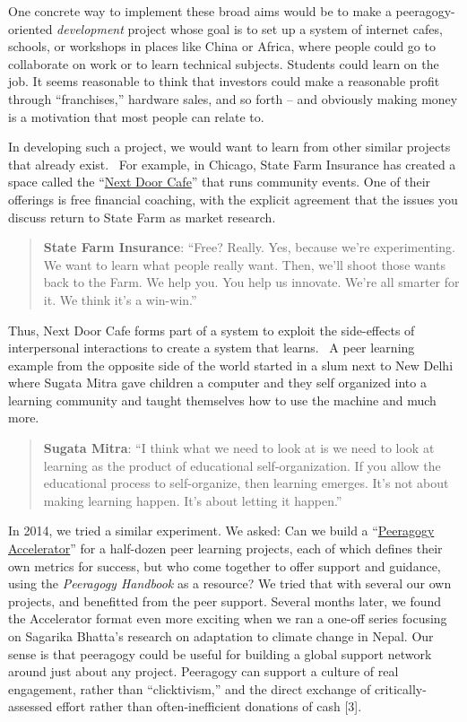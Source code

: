 One concrete way to implement these broad aims would be to make a
peeragogy-oriented \emph{development} project whose goal is to set up a
system of internet cafes, schools, or workshops in places like China or
Africa, where people could go to collaborate on work or to learn
technical subjects. Students could learn on the job. It seems reasonable
to think that investors could make a reasonable profit through
``franchises,'' hardware sales, and so forth -- and obviously making
money is a motivation that most people can relate to.

In developing such a project, we would want to learn from other similar
projects that already exist. ~For example, in Chicago, State Farm
Insurance has created a space called the
``\href{https://www.nextdoorchi.com/}{Next Door Cafe}'' that runs
community events. One of their offerings is free financial coaching,
with the explicit agreement that the issues you discuss return to State
Farm as market research.

\begin{quote}
\textbf{State Farm Insurance}: ``Free? Really. Yes, because we're
experimenting.  We want to learn what people really want. Then, we'll
shoot those wants back to the Farm. We help you. You help us
innovate. We're all smarter for it. We think it's a win-win.''
\end{quote}

Thus, Next Door Cafe forms part of a system to exploit the side-effects
of interpersonal interactions to create a system that learns.~ A peer
learning example from the opposite side of the world started in a slum
next to New Delhi where Sugata Mitra gave children a computer and they
self organized into a learning community and taught themselves how to
use the machine and much more.

\begin{quote}
\textbf{Sugata Mitra}: ``I think what we need to look at is we need to
look at learning as the product of educational self-organization. If
you allow the educational process to self-organize, then learning
emerges.  It's not about making learning happen. It's about letting it
happen.''
\end{quote}

In 2014, we tried a similar experiment.  We asked: Can we build a
``\href{http://commonsabundance.net/docs/help-build-the-peeragogy-accelerator-work-in-progress/}{Peeragogy
  Accelerator}'' for a half-dozen peer learning projects, each of
which defines their own metrics for success, but who come together to
offer support and guidance, using the \emph{Peeragogy Handbook} as a
resource?  We tried that with several our own projects, and benefitted
from the peer support.  Several months later, we found the Accelerator
format even more exciting when we ran a one-off series focusing on
Sagarika Bhatta's research on adaptation to climate change in Nepal.
Our sense is that peeragogy could be useful for building a global
support network around just about any project.  Peeragogy can support
a culture of real engagement, rather than ``clicktivism,'' and the
direct exchange of critically-assessed effort rather than
often-inefficient donations of cash [3].

